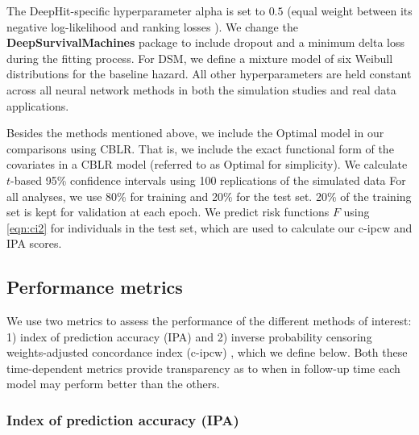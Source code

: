 \documentclass[AMA,STIX1COL,]{WileyNJD-v2}
\begin{document}
The DeepHit-specific hyperparameter alpha is set to \(0.5\) (equal
weight between its negative log-likelihood and ranking losses
\citep{lee2018DeepHit}). We change the \textbf{DeepSurvivalMachines}
\citep{dsmPaper} package to include dropout and a minimum delta loss
during the fitting process. For DSM, we define a mixture model of six
Weibull distributions for the baseline hazard. All other hyperparameters
are held constant across all neural network methods in both the
simulation studies and real data applications.

Besides the methods mentioned above, we include the Optimal model in our
comparisons using CBLR. That is, we include the exact functional form of
the covariates in a CBLR model (referred to as Optimal for simplicity).
We calculate \(t\)-based 95\% confidence intervals using 100
replications of the simulated data For all analyses, we use 80\% for
training and 20\% for the test set. 20\% of the training set is kept for
validation at each epoch. We predict risk functions \(F\) using
\eqref{eqn:ci2} for individuals in the test set, which are used to
calculate our c-ipcw and IPA scores.

\hypertarget{performance-metrics}{%
\subsection{Performance metrics}\label{performance-metrics}}

We use two metrics to assess the performance of the different methods of
interest: 1) index of prediction accuracy (IPA) \citep{kattan2018index}
and 2) inverse probability censoring weights-adjusted concordance index
(c-ipcw) \citep{uno2011}, which we define below. Both these
time-dependent metrics provide transparency as to when in follow-up time
each model may perform better than the others.

\hypertarget{index-of-prediction-accuracy-ipa}{%
\subsubsection{Index of prediction accuracy
(IPA)}\label{index-of-prediction-accuracy-ipa}}
\end{document}
